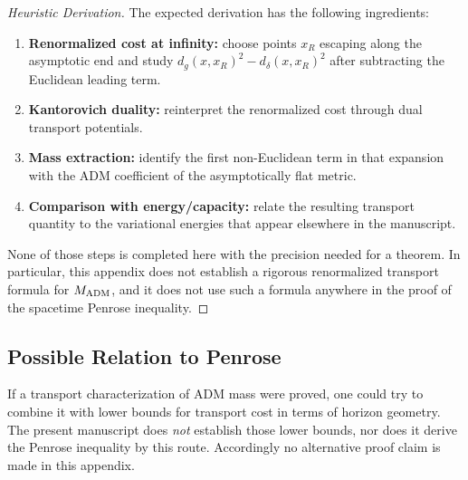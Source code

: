 \begin{proof}[Heuristic Derivation]
The expected derivation has the following ingredients:
\begin{enumerate}
    \item \textbf{Renormalized cost at infinity:} choose points $x_R$ escaping along the asymptotic end and study $d_g(x,x_R)^2 - d_\delta(x,x_R)^2$ after subtracting the Euclidean leading term.
    \item \textbf{Kantorovich duality:} reinterpret the renormalized cost through dual transport potentials.
    \item \textbf{Mass extraction:} identify the first non-Euclidean term in that expansion with the ADM coefficient of the asymptotically flat metric.
    \item \textbf{Comparison with energy/capacity:} relate the resulting transport quantity to the variational energies that appear elsewhere in the manuscript.
\end{enumerate}

None of those steps is completed here with the precision needed for a theorem. In particular, this appendix does not establish a rigorous renormalized transport formula for $M_{\mathrm{ADM}}$, and it does not use such a formula anywhere in the proof of the spacetime Penrose inequality.
\end{proof}

\subsection{Possible Relation to Penrose}
If a transport characterization of ADM mass were proved, one could try to combine it with lower bounds for transport cost in terms of horizon geometry. The present manuscript does \emph{not} establish those lower bounds, nor does it derive the Penrose inequality by this route. Accordingly no alternative proof claim is made in this appendix.
